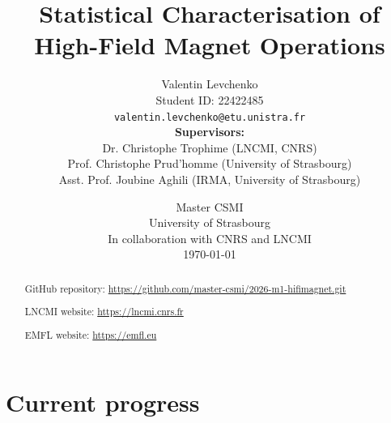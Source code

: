 \documentclass[english,10pt,a4paper]{article}
\begin{document}
\title{Statistical Characterisation of High-Field Magnet Operations}
\author{Valentin Levchenko \\
        Student ID: 22422485 \\
        \texttt{valentin.levchenko@etu.unistra.fr} \\ [0.5cm]
        \textbf{Supervisors:} \\
        Dr. Christophe Trophime (LNCMI, CNRS) \\
        Prof. Christophe Prud'homme (University of Strasbourg) \\
        Asst. Prof. Joubine Aghili (IRMA, University of Strasbourg)
}
\date{
    Master CSMI \\
    University of Strasbourg \\
    In collaboration with CNRS and LNCMI \\
    \today
}

\maketitle



\begin{abstract}


    GitHub repository:
    \url{https://github.com/master-csmi/2026-m1-hifimagnet.git}

    LNCMI website: \url{https://lncmi.cnrs.fr}

    EMFL website: \url{https://emfl.eu}
\end{abstract}



\newpage
\tableofcontents
\newpage



\section{Current progress}
\end{document}

